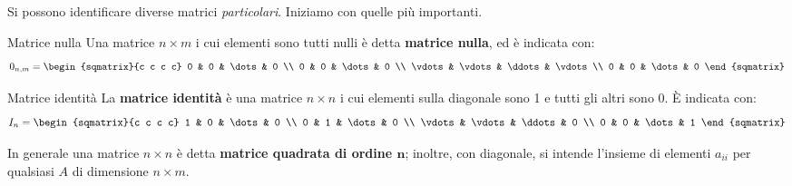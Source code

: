 Si possono identificare diverse matrici \textit{particolari}. Iniziamo con quelle più importanti.
\begin{newdef}{Matrice nulla}
    Una matrice $n \times m$ i cui elementi sono tutti nulli è detta \textbf{matrice nulla}, ed è indicata con:
    \[
        0_{n,m} =
        \begin{sqmatrix}{c c c c}
            0 & 0 & \dots & 0 \\
            0 & 0 & \dots & 0 \\
            \vdots & \vdots & \ddots & \vdots \\
            0 & 0 & \dots & 0
        \end{sqmatrix}
    \]
\end{newdef}
\begin{newdef}{Matrice identità}
    La \textbf{matrice identità} è una matrice $n \times n$ i cui elementi sulla diagonale sono 1 e tutti gli altri sono 0. È indicata con:
    \[
        I_n =
        \begin{sqmatrix}{c c c c}
            1 & 0 & \dots & 0 \\
            0 & 1 & \dots & 0 \\
            \vdots & \vdots & \ddots & 0 \\
            0 & 0 & \dots & 1
        \end{sqmatrix}
    \]
\end{newdef}
In generale una matrice $n \times n$ è detta \textbf{matrice quadrata di ordine $\bm{n}$}; inoltre, con diagonale, si intende l'insieme di elementi $a_{ii}$ per qualsiasi $A$ di dimensione $n \times m$.

